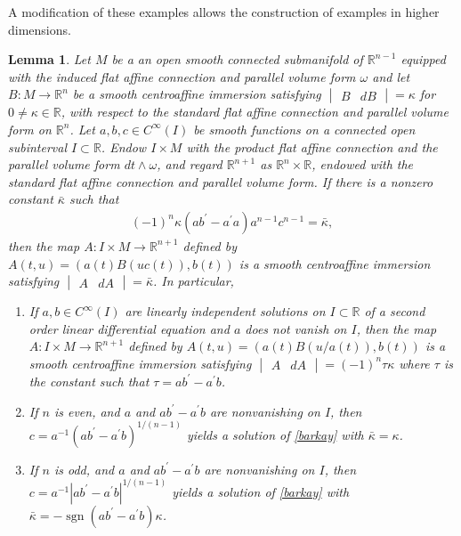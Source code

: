 \documentclass [leqno, 10pt]{amsart}
\newtheorem{lemma}[theorem]{Lemma}
\theoremstyle{definition}
\numberwithin{equation}{section}
\newcommand{\om}{\omega}
\newcommand{\ka}{\kappa}
\newcommand{\cinf}{C^{\infty}}
\newcommand{\sign}{\operatorname{sgn}}
\newcommand{\rea}{\mathbb R}
\begin{document}
A modification of these examples allows the construction of examples in higher dimensions.
\begin{lemma}\label{extensionlemma}
Let $M$ be a an open smooth connected submanifold of $\rea^{n-1}$ equipped with the induced flat affine connection and parallel volume form $\om$ and let $B:M \to \rea^{n}$ be a smooth centroaffine immersion satisfying $\begin{vmatrix} B & dB \end{vmatrix} = \ka$ for $0 \neq \ka \in \rea$, with respect to the standard flat affine connection and parallel volume form on $\rea^{n}$. Let $a, b, c \in \cinf(I)$ be smooth functions on a connected open subinterval $I \subset \rea$. Endow $I \times M$ with the product flat affine connection and the parallel volume form $dt \wedge \om$, and regard $\rea^{n+1}$ as $\rea^{n} \times \rea$, endowed with the standard flat affine connection and parallel volume form. If there is a nonzero constant $\bar{\ka}$ such that 
\begin{align}\label{barkay}
(-1)^{n}\ka \left(ab^{\prime} - a^{\prime}a\right)a^{n-1}c^{n-1} = \bar{\ka},
\end{align}
then the map $A:I \times M \to \rea^{n+1}$ defined by $A(t, u) = (a(t) B(uc(t)), b(t))$ is a smooth centroaffine immersion satisfying $\begin{vmatrix} A & dA \end{vmatrix} = \bar{\ka}$. In particular,
\begin{enumerate}
\item\label{barkay1} If $a, b \in \cinf(I)$ are linearly independent solutions on $I \subset \rea$ of a second order linear differential equation and $a$ does not vanish on $I$, then  the map $A:I \times M \to \rea^{n+1}$ defined by $A(t, u) = (a(t) B(u/a(t)), b(t))$ is a smooth centroaffine immersion satisfying $\begin{vmatrix} A & dA \end{vmatrix} = (-1)^{n}\tau\ka$ where $\tau$ is the constant such that $\tau = ab^{\prime} - a^{\prime}b$. 
\item\label{barkay2} If $n$ is even, and $a$ and $ab^{\prime} - a^{\prime}b$ are nonvanishing on $I$, then $c = a^{-1}(ab^{\prime} - a^{\prime}b)^{1/(n-1)}$ yields a solution of \eqref{barkay} with $\bar{\ka} = \ka$.
\item If $n$ is odd, and $a$ and $ab^{\prime} - a^{\prime}b$ are nonvanishing on $I$, then $c = a^{-1}|ab^{\prime} - a^{\prime}b|^{1/(n-1)}$ yields a solution of \eqref{barkay} with $\bar{\ka} = -\sign(ab^{\prime} - a^{\prime}b)\ka$.
\end{enumerate}
\end{lemma}
\end{document}
